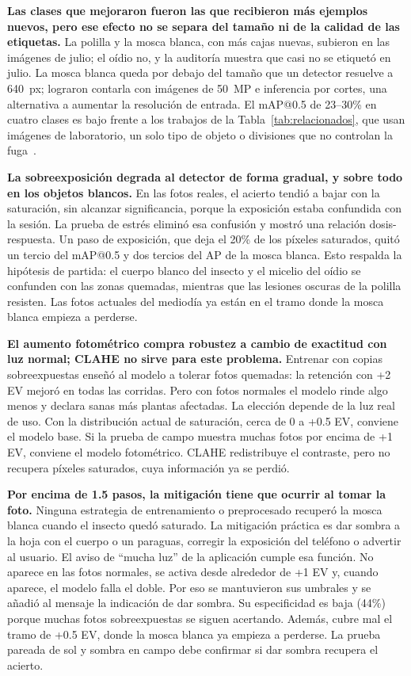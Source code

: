 \documentclass[sensors,article,submit,pdftex,moreauthors]{Definitions/mdpi}
\begin{document}
\textbf{Las clases que mejoraron fueron las que recibieron más ejemplos nuevos, pero ese efecto no se separa del tamaño ni de la calidad de las etiquetas.} La polilla y la mosca blanca, con más cajas nuevas, subieron en las imágenes de julio; el oídio no, y la auditoría muestra que casi no se etiquetó en julio. La mosca blanca queda por debajo del tamaño que un detector resuelve a 640~px; \citet{Zhao2025} lograron contarla con imágenes de 50~MP e inferencia por cortes, una alternativa a aumentar la resolución de entrada. El mAP@0.5 de 23--30\% en cuatro clases es bajo frente a los trabajos de la Tabla~\ref{tab:relacionados}, que usan imágenes de laboratorio, un solo tipo de objeto o divisiones que no controlan la fuga~\cite{Gerz2025}.

\textbf{La sobreexposición degrada al detector de forma gradual, y sobre todo en los objetos blancos.} En las fotos reales, el acierto tendió a bajar con la saturación, sin alcanzar significancia, porque la exposición estaba confundida con la sesión. La prueba de estrés eliminó esa confusión y mostró una relación dosis-respuesta. Un paso de exposición, que deja el 20\% de los píxeles saturados, quitó un tercio del mAP@0.5 y dos tercios del AP de la mosca blanca. Esto respalda la hipótesis de partida: el cuerpo blanco del insecto y el micelio del oídio se confunden con las zonas quemadas, mientras que las lesiones oscuras de la polilla resisten. Las fotos actuales del mediodía ya están en el tramo donde la mosca blanca empieza a perderse.

\textbf{El aumento fotométrico compra robustez a cambio de exactitud con luz normal; CLAHE no sirve para este problema.} Entrenar con copias sobreexpuestas enseñó al modelo a tolerar fotos quemadas: la retención con +2 EV mejoró en todas las corridas. Pero con fotos normales el modelo rinde algo menos y declara sanas más plantas afectadas. La elección depende de la luz real de uso. Con la distribución actual de saturación, cerca de 0 a +0.5 EV, conviene el modelo base. Si la prueba de campo muestra muchas fotos por encima de +1 EV, conviene el modelo fotométrico. CLAHE redistribuye el contraste, pero no recupera píxeles saturados, cuya información ya se perdió.

\textbf{Por encima de 1.5 pasos, la mitigación tiene que ocurrir al tomar la foto.} Ninguna estrategia de entrenamiento o preprocesado recuperó la mosca blanca cuando el insecto quedó saturado. La mitigación práctica es dar sombra a la hoja con el cuerpo o un paraguas, corregir la exposición del teléfono o advertir al usuario. El aviso de ``mucha luz'' de la aplicación cumple esa función. No aparece en las fotos normales, se activa desde alrededor de +1 EV y, cuando aparece, el modelo falla el doble. Por eso se mantuvieron sus umbrales y se añadió al mensaje la indicación de dar sombra. Su especificidad es baja (44\%) porque muchas fotos sobreexpuestas se siguen acertando. Además, cubre mal el tramo de +0.5 EV, donde la mosca blanca ya empieza a perderse. La prueba pareada de sol y sombra en campo debe confirmar si dar sombra recupera el acierto.
\end{document}
